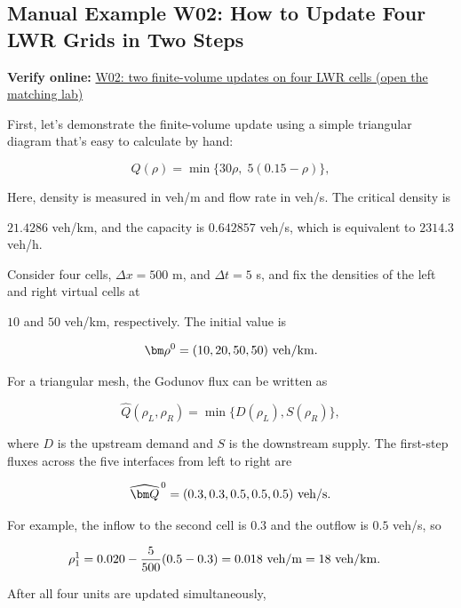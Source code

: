\documentclass[11pt,a4paper,openany]{book}
\numberwithin{equation}{chapter}
\numberwithin{figure}{chapter}
\numberwithin{table}{chapter}
\newcommand{\onlinelab}[2]{%
  \par\smallskip\noindent
  {\small\sffamily\color{teal}\textbf{Verify online: }\href{https://cwan-ucr.github.io/traffic-stability-book/lab/?case=#1}{#2 (open the matching lab)}}%
  \par\smallskip}
\begin{document}
\subsection{Manual Example W02: How to Update Four LWR Grids in Two Steps}
\onlinelab{W02}{W02: two finite-volume updates on four LWR cells}


\label{sub:worked-lwr}




First, let’s demonstrate the finite-volume update using a simple triangular diagram that’s easy to calculate by hand:

\begin{equation}
Q(\rho)=\min\{30\rho,\;5(0.15-\rho)\},
\label{eq:w02-triangular-fd}
\end{equation}

Here, density is measured in veh/m and flow rate in veh/s. The critical density is

$21.4286$ veh/km, and the capacity is $0.642857$ veh/s, which is equivalent to $2314.3$ veh/h.

Consider four cells, $\Delta x=500$ m, and $\Delta t=5$ s, and fix the densities of the left and right virtual cells at

$10$ and $50$ veh/km, respectively. The initial value is

\begin{equation}
\bm\rho^0=(10,20,50,50)\ {\rm veh/km}.
\label{eq:w02-initial}
\end{equation}

For a triangular mesh, the Godunov flux can be written as

\[
\widehat Q(\rho_L,\rho_R)=\min\{D(\rho_L),S(\rho_R)\},
\]

where $D$ is the upstream demand and $S$ is the downstream supply. The first-step fluxes across the five interfaces from left to right are

\begin{equation}
\widehat{\bm Q}^{\,0}=(0.3,0.3,0.5,0.5,0.5)\ {\rm veh/s}.
\label{eq:w02-first-flux}
\end{equation}

For example, the inflow to the second cell is $0.3$ and the outflow is $0.5$ veh/s, so

\begin{align}
\rho_1^1
&=0.020-\frac{5}{500}(0.5-0.3)
=0.018\ {\rm veh/m}
=18\ {\rm veh/km}.
\label{eq:w02-cell-update}
\end{align}

After all four units are updated simultaneously,
\end{document}
